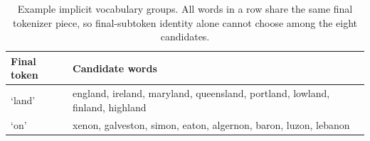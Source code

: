 \begin{table}[t]
    \centering
    \caption{Example implicit vocabulary groups. All words in a row share the same final tokenizer piece, so final-subtoken identity alone cannot choose among the eight candidates.}
    \label{tab:vocab_examples}
    \begin{tabular}{@{}ll@{}}
        \toprule
        \textbf{Final token} & \textbf{Candidate words} \\
        \midrule
        `land' & england, ireland, maryland, queensland, portland, lowland, finland, highland \\
        `on' & xenon, galveston, simon, eaton, algernon, baron, luzon, lebanon \\
        \bottomrule
    \end{tabular}
\end{table}
